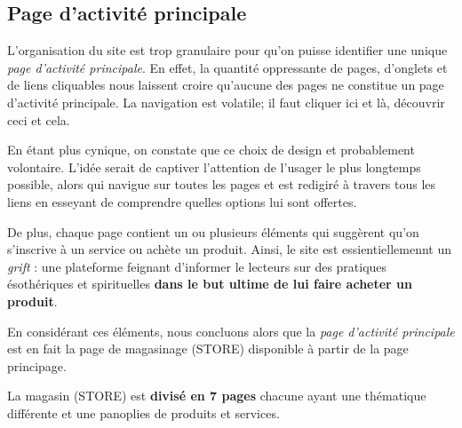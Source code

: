 \documentclass[9pt]{report}
\begin{document}
\begin{multicols*}{2}
  \section{Page d'activité principale}
  L'organisation du site est trop granulaire pour qu'on puisse identifier 
  une unique \textit{page d'activité principale}. En effet, la quantité 
  oppressante de pages, d'onglets et de liens cliquables nous laissent 
  croire qu'aucune des pages ne constitue un page d'activité principale. 
  La navigation est volatile; il faut cliquer ici et là, découvrir ceci et 
  cela. 

  En étant plus cynique, on constate que ce choix de design et probablement 
  volontaire. L'idée serait de captiver l'attention  de l'usager le plus 
  longtemps possible, alors qui navigue sur toutes les pages 
  et est redigiré à travers tous les liens en esseyant de comprendre 
  quelles options lui sont offertes. 
  
  De plus, chaque page contient un ou plusieurs éléments qui suggèrent 
  qu'on s'inscrive à un service ou achète un produit. Ainsi, le site 
  est essientiellemennt un \textit{grift} : une plateforme feignant 
  d'informer le lecteurs sur des pratiques ésothériques et spirituelles 
  \textbf{dans le but ultime de lui faire acheter un produit}.
  
  En considérant ces éléments, nous concluons alors que la 
  \textit{page d'activité principale} est en fait la page de magasinage 
  (STORE) disponible à partir de la page principage.

  \begin{note}{}{}
    La magasin (STORE) est \textbf{divisé en 7 pages} chacune ayant une thématique 
    différente et une panoplies de produits et services. 
  \end{note}


    \begin{figure}[H]
    \scriptsize{
     }
    \end{figure}


\end{multicols*}
\end{document}
